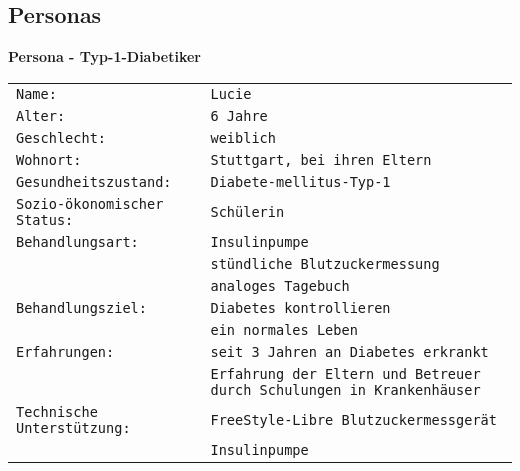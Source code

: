 	\subsection{Personas}
	\textbf{Persona - Typ-1-Diabetiker}
	\addtocounter{table}{-1}
	\begin{center}
		\begin{longtable}[H]{p{6.6cm}p{6.6cm}}
			\texttt{Name: }& \texttt{Lucie}\\
			\texttt{Alter: }& \texttt{6 Jahre}\\
			\texttt{Geschlecht: }&\texttt{weiblich}\\
			\texttt{Wohnort:} & \texttt{Stuttgart, bei ihren Eltern}\\
			\texttt{Gesundheitszustand:} & \texttt{Diabete-mellitus-Typ-1}\\
			\texttt{Sozio-ökonomischer Status: }& \texttt{Schülerin}\\
			\texttt{Behandlungsart:} & \texttt{Insulinpumpe}\\
			& \texttt{stündliche Blutzuckermessung}\\
			& \texttt{analoges Tagebuch}\\
			\texttt{Behandlungsziel:} & \texttt{Diabetes kontrollieren}\\
			& \texttt{ein normales Leben}\\
			\texttt{Erfahrungen: }& \texttt{seit 3 Jahren an Diabetes erkrankt}\\
			& \texttt{Erfahrung der Eltern und Betreuer durch Schulungen in Krankenhäuser}\\
			\texttt{Technische Unterstützung:} & \texttt{FreeStyle-Libre Blutzuckermessgerät}\\
			& \texttt{Insulinpumpe}\\
		\end{longtable}
	\end{center}
